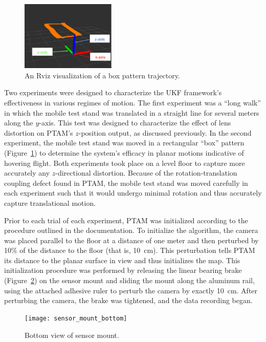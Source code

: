 \begin{figure}
  \centering
    \includegraphics[width=0.4\textwidth]{good_box_5_cropped}
  \caption[Rviz Visualization of a Box Pattern Trajectory]{An Rviz visualization of a box pattern trajectory.}
  \label{fig:good_box}
\end{figure}

Two experiments were designed to characterize the UKF framework's effectiveness in various regimes of motion. The first experiment was a ``long walk'' in which the mobile test stand was translated in a straight line for several meters along the $y$-axis. This test was designed to characterize the effect of lens distortion on PTAM's $z$-position output, as discussed previously. In the second experiment, the mobile test stand was moved in a rectangular ``box'' pattern (Figure~\ref{fig:good_box}) to determine the system's efficacy in planar motions indicative of hovering flight. Both experiments took place on a level floor to capture more accurately any $z$-directional distortion. Because of the rotation-translation coupling defect found in PTAM, the mobile test stand was moved carefully in each experiment such that it would undergo minimal rotation and thus accurately capture translational motion.

Prior to each trial of each experiment, PTAM was initialized according to the procedure outlined in the documentation. To initialize the algorithm, the camera was placed parallel to the floor at a distance of one meter and then perturbed by 10\% of the distance to the floor (that is, 10~cm). This perturbation tells PTAM its distance to the planar surface in view and thus initializes the map. This initialization procedure was performed by releasing the linear bearing brake (Figure~\ref{fig:sensor_mount_bottom}) on the sensor mount and sliding the mount along the aluminum rail, using the attached adhesive ruler to perturb the camera by exactly 10~cm. After perturbing the camera, the brake was tightened, and the data recording began.

\begin{figure}
        \centering
        \texttt{[image: sensor\_mount\_bottom]}
        \caption{Bottom view of sensor mount.}
        \label{fig:sensor_mount_bottom}
\end{figure}

